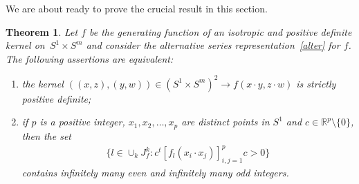 \documentclass[11pt]{article}
\numberwithin{equation}{section}
\newtheorem{Theorem}{Theorem}[section]
\begin{document}
We are about ready to prove the crucial result in this section.

\begin{Theorem} \label{key}
Let $f$ be the generating function of an isotropic and positive definite kernel on~\mbox{$S^1 \times S^m$} and consider the alternative series representation~\eqref{alter} for $f$. The following assertions are equivalent:
\begin{enumerate}\itemsep=0pt
\item[$(i)$] the kernel $((x,z), (y,w)) \in (S^1 \times S^m)^2 \to f(x \cdot y, z \cdot w)$ is strictly positive definite;
\item[$(ii)$] if $p$ is a positive integer, $x_1, x_2, \ldots, x_p$ are distinct points in $S^1$ and $c\in \mathbb{R}^p\setminus\{0\}$, then the set
\begin{gather*}\big\{l\in \cup_{k}J_f^k \colon c^{t} [f_l(x_i \cdot x_j)]_{i,j=1}^p c>0\big\}\end{gather*}
contains infinitely many even and infinitely many odd integers.
\end{enumerate}
\end{Theorem}
\end{document}
